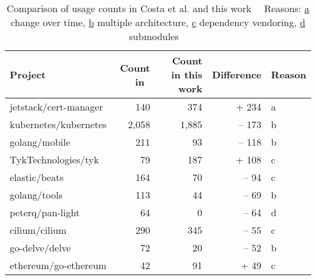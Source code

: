 \begin{table}[h]
    \centering
    \caption[Comparison of \unsafe{} usage counts Costa et al. and this work]%
    {Comparison of \unsafe{} usage counts in Costa et al. and this work~\newline \tiny ~\newline \footnotesize
    Reasons: \underline{a} change over time, \underline{b} multiple architecture, \underline{c} dependency vendoring,
    \underline{d} submodules \tiny ~\newline}
    \label{tbl:costa-counts-comparison}
    \begin{tabular}{l|r|r|r|l}
        \toprule
        Project & Count in~\cite{costa2020} & Count in this work & Difference & Reason \\
        \midrule
        jetstack/cert-manager  &   140 &   374 &  + 234 & a \\
        kubernetes/kubernetes  & 2,058 & 1,885 & -- 173 & b \\
        golang/mobile          &   211 &    93 & -- 118 & b \\
        TykTechnologies/tyk    &    79 &   187 &  + 108 & c \\
        elastic/beats          &   164 &    70 &  -- 94 & c \\
        golang/tools           &   113 &    44 &  -- 69 & b \\
        peterq/pan-light       &    64 &     0 &  -- 64 & d \\
        cilium/cilium          &   290 &   345 &  -- 55 & c \\
        go-delve/delve         &    72 &    20 &  -- 52 & b \\
        ethereum/go-ethereum   &    42 &    91 &   + 49 & c \\
        \bottomrule
    \end{tabular}
\end{table}